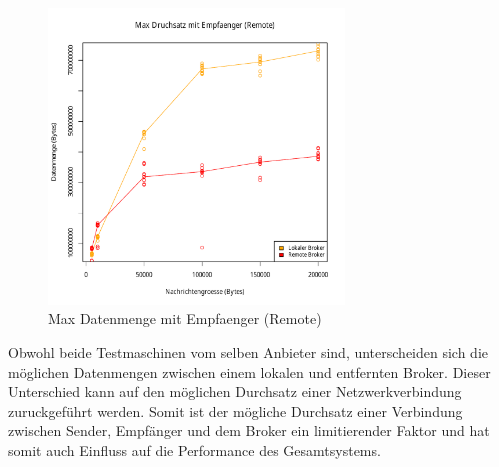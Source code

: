 \begin{figure}
\center
 \includegraphics[width=0.7\textwidth]{images/measurement/rate-limit-unlimited-AvsB.pdf}
  \caption{Max Datenmenge mit Empfaenger (Remote)}
  \label{img:maxByteThroughputB}
\end{figure}
Obwohl beide Testmaschinen vom selben Anbieter sind, unterscheiden sich die möglichen Datenmengen zwischen einem lokalen und entfernten Broker. Dieser Unterschied kann auf den möglichen Durchsatz einer Netzwerkverbindung zuruckgeführt werden. Somit ist der mögliche Durchsatz einer Verbindung zwischen Sender, Empfänger und dem Broker ein limitierender Faktor und hat somit auch Einfluss auf die Performance des Gesamtsystems.

